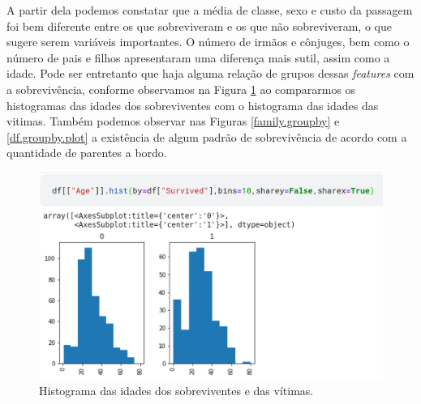 \documentclass{article}
\begin{document}
A partir dela podemos constatar que a média de classe, sexo e custo da passagem foi bem diferente entre os que sobreviveram e os que não sobreviveram, o que sugere serem variáveis importantes. O número de irmãos e cônjuges, bem como o número de pais e filhos apresentaram uma diferença mais sutil, assim como a idade. Pode ser entretanto que haja alguma relação de grupos dessas \emph{features} com a sobrevivência, conforme observamos na Figura \ref{age.hist} ao compararmos os histogramas das idades dos sobreviventes com o histograma das idades das vitimas. 
Também podemos observar nas Figuras \ref{family.groupby} e \ref{df.groupby.plot} a existência de algum padrão de sobrevivência de acordo com a quantidade de parentes a bordo. 
\begin{figure}[H]
\centering
\includegraphics[width=\textwidth]{Figures/age.hist.png}
\caption{Histograma das idades dos sobreviventes e das vítimas.}
\label{age.hist}
\end{figure}
\end{document}
